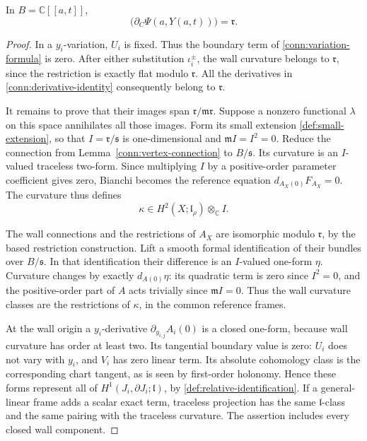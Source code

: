 \begin{proposition}
\label{conn:derivative-ideal}
In \(B=\mathbb C[[a,t]]\),
\begin{equation}
 \bigl(\partial_C\Psi(a,Y(a,t))\bigr)=\mathfrak r.
 \label{conn:derivative-identity}
\end{equation}
\end{proposition}

\begin{proof}
In a \(y_i\)-variation, \(U_i\) is fixed.  Thus the boundary
term of \eqref{conn:variation-formula} is zero.
After either substitution \(\iota_i^\pm\), the wall curvature
belongs to \(\mathfrak r\), since the restriction is exactly
flat modulo \(\mathfrak r\).  All the derivatives in
\eqref{conn:derivative-identity} consequently belong to
\(\mathfrak r\).

It remains to prove that their images span
\(\mathfrak r/\mathfrak m\mathfrak r\).
Suppose a nonzero functional \(\lambda\) on this space
annihilates all those images.  Form its small extension
\eqref{def:small-extension}, so that
\(I=\mathfrak r/\mathfrak s\) is one-dimensional and
\(\mathfrak mI=I^2=0\).
Reduce the connection from Lemma~\ref{conn:vertex-connection}
to \(B/\mathfrak s\).  Its curvature is an \(I\)-valued
traceless two-form.  Since multiplying \(I\) by a
positive-order parameter coefficient gives zero, Bianchi
becomes the reference equation
\(d_{A_X(0)}F_{A_X}=0\).  The curvature thus defines
\[
 \kappa\in H^2(X;\mathfrak l_\rho)\otimes_{\mathbb C} I.
\]

The wall connections and the restrictions of \(A_X\)
are isomorphic modulo \(\mathfrak r\), by the based
restriction construction.  Lift a smooth formal
identification of their bundles over \(B/\mathfrak s\).
In that identification their difference is an
\(I\)-valued one-form \(\eta\).  Curvature changes by
exactly \(d_{A(0)}\eta\): its quadratic term is zero since
\(I^2=0\), and the positive-order part of \(A\) acts
trivially since \(\mathfrak mI=0\).
Thus the wall curvature classes are the restrictions
of \(\kappa\), in the common reference frames.

At the wall origin a \(y_i\)-derivative
\(\partial_{y_{i,j}}A_i(0)\) is a closed one-form, because
wall curvature has order at least two.  Its tangential
boundary value is zero: \(U_i\) does not vary with \(y_i\),
and \(V_i\) has zero linear term.  Its absolute cohomology
class is the corresponding chart tangent, as is seen by
first-order holonomy.  Hence these forms represent all
of \(H^1(J_i,\partial J_i;\mathfrak l)\), by
\eqref{def:relative-identification}.
If a general-linear frame adds a scalar exact term,
traceless projection has the same \(\mathfrak l\)-class
and the same pairing with the traceless curvature.
The assertion includes every closed wall component.


\end{proof}
